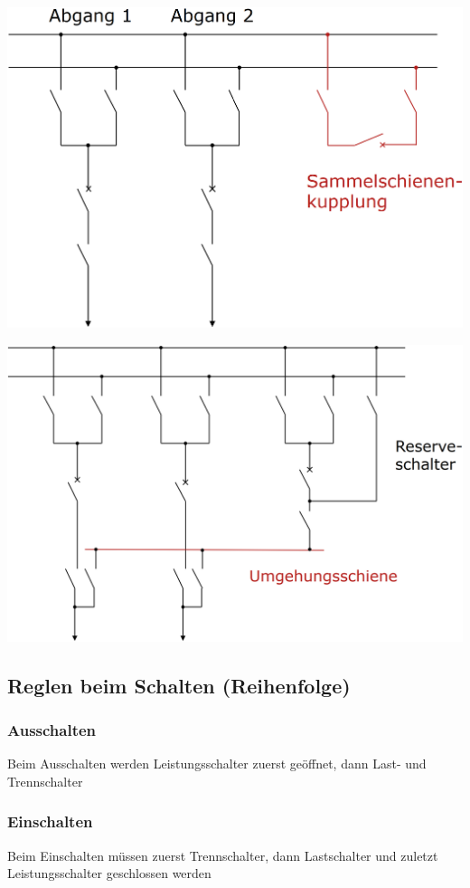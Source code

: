 \begin{minipage}[c]{0.48\columnwidth}
    \begin{center}
        \includegraphics[width=0.98\columnwidth]{images/Sammelscheinenkupplung.png}
    \end{center}
\end{minipage}
\hfill
\begin{minipage}[c]{0.48\columnwidth}
    \begin{center}
        \includegraphics[width=0.98\columnwidth]{images/Umgehungsschiene.png}
    \end{center}
\end{minipage}

\subsection{Reglen beim Schalten (Reihenfolge)}

\subsubsection{Ausschalten}
Beim Ausschalten werden Leistungsschalter zuerst geöffnet, dann Last- und Trennschalter
\subsubsection{Einschalten}
Beim Einschalten müssen zuerst Trennschalter, dann Lastschalter und zuletzt Leistungsschalter geschlossen werden






